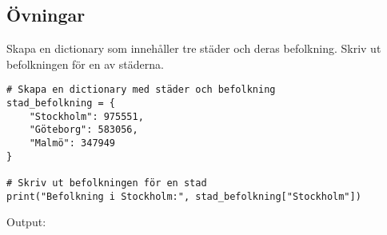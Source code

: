 \subsection{Övningar}
\begin{exercise}
Skapa en dictionary som innehåller tre städer och deras befolkning. Skriv ut befolkningen för en av städerna.
\end{exercise}
\begin{solution}
\begin{lstlisting}
# Skapa en dictionary med städer och befolkning
stad_befolkning = {
    "Stockholm": 975551,
    "Göteborg": 583056,
    "Malmö": 347949
}

# Skriv ut befolkningen för en stad
print("Befolkning i Stockholm:", stad_befolkning["Stockholm"])
\end{lstlisting}
Output:
\end{solution}

